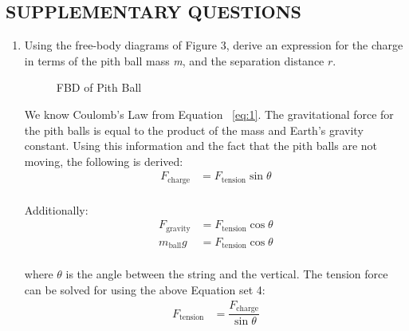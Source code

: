 \documentclass [12pt, letterpaper, twoside]{article}
\begin{document}
\subsection*{SUPPLEMENTARY QUESTIONS}
\begin{enumerate}
  \item{Using the free-body diagrams of Figure 3, derive an expression for the charge in terms of the pith ball mass \emph{m}, and the separation distance \(r\).}

    \begin{figure}
      \centering
      \caption{FBD of Pith Ball}
      \label{fig:8}
    \end{figure}
    We know Coulomb's Law from Equation ~\ref{eq:1}. The gravitational force for the pith balls is equal to the product of the mass and Earth's gravity constant. Using this information and the fact that the pith balls are not moving, the following is derived:
    \begin{equation*}
      \begin{split}
        F_{\text{charge}} &= F_{\text{tension}}\sin{\theta} \\
      \end{split}
    \end{equation*}

    \noindent
    Additionally:
    \begin{equation}
      \begin{split}
        F_{\text{gravity}} &= F_{\text{tension}}\cos{\theta} \\
        m_{\text{ball}}g &= F_{\text{tension}}\cos{\theta} \\
      \end{split}
    \end{equation}

    \noindent
    where \(\theta\) is the angle between the string and the vertical. The tension force can be solved for using the above Equation set 4:
    \begin{equation}
      \begin{split}
        F_{\text{tension}} &= \dfrac{F_{\text{charge}}}{\sin{\theta}} \\
      \end{split}
    \end{equation}


\end{enumerate}
\end{document}
